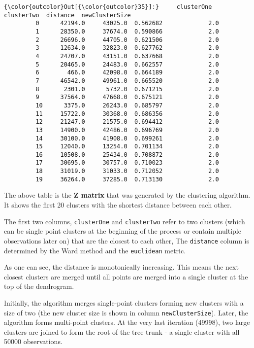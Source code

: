 \documentclass[11pt]{article}
\begin{document}
\begin{Verbatim}[commandchars=\\\{\}]
{\color{outcolor}Out[{\color{outcolor}35}]:}     clusterOne  clusterTwo  distance  newClusterSize
         0      42194.0     43025.0  0.562682             2.0
         1      28350.0     37674.0  0.590866             2.0
         2      26696.0     44705.0  0.621506             2.0
         3      12634.0     32823.0  0.627762             2.0
         4      24707.0     43151.0  0.637668             2.0
         5      20465.0     24483.0  0.662557             2.0
         6        466.0     42098.0  0.664189             2.0
         7      46542.0     49961.0  0.665520             2.0
         8       2301.0      5732.0  0.671215             2.0
         9      37564.0     47668.0  0.675121             2.0
         10      3375.0     26243.0  0.685797             2.0
         11     15722.0     30368.0  0.686356             2.0
         12     21247.0     21575.0  0.694412             2.0
         13     14900.0     42486.0  0.696769             2.0
         14     30100.0     41908.0  0.699261             2.0
         15     12040.0     13254.0  0.701134             2.0
         16     10508.0     25434.0  0.708872             2.0
         17     30695.0     30757.0  0.710023             2.0
         18     31019.0     31033.0  0.712052             2.0
         19     36264.0     37285.0  0.713130             2.0
\end{Verbatim}
            
    The above table is the \textbf{Z matrix} that was generated by the
clustering algorithm. It shows the first 20 clusters with the shortest
distance between each other.

The first two columns, \texttt{clusterOne} and \texttt{clusterTwo} refer
to two clusters (which can be single point clusters at the beginning of
the process or contain multiple observations later on) that are the
closest to each other, The \texttt{distance} column is determined by the
Ward method and the \texttt{euclidean} metric.

As one can see, the distance is monotonically increasing. This means the
next closest clusters are merged until all points are merged into a
single cluster at the top of the dendrogram.

Initially, the algorithm merges single-point clusters forming new
clusters with a size of two (the new cluster size is shown in column
\texttt{newClusterSize}). Later, the algorithm forms multi-point
clusters. At the very last iteration (49998), two large clusters are
joined to form the root of the tree trunk - a single cluster with all
50000 observations.
\end{document}
